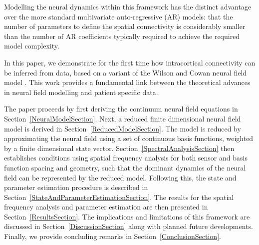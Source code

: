 \documentclass[twocolumn,11pt,a4paper]{article}		%
\begin{document}
Modelling the neural dynamics within this framework has the distinct advantage over the more standard multivariate auto-regressive (AR) models: that the number of parameters to define the spatial connectivity is considerably smaller than the number of AR coefficients typically required to achieve the required model complexity. 

In this paper, we demonstrate for the first time how intracortical connectivity can be inferred from data, based on a variant of the Wilson and Cowan neural field model \cite{Wilson1973}. This work provides a fundamental link between the theoretical advances in neural field modelling and patient specific data.

The paper proceeds by first deriving the continuum neural field equations in Section~\ref{NeuralModelSection}. Next, a reduced finite dimensional neural field model is derived in Section~\ref{ReducedModelSection}. The model is reduced by approximating the neural field using a set of continuous basis functions, weighted by a finite dimensional state vector. Section~\ref{SpectralAnalysisSection} then establishes conditions using spatial frequency analysis for both sensor and basis function spacing and geometry, such that the dominant dynamics of the neural field can be represented by the reduced model. Following this, the state and parameter estimation procedure is described in Section~\ref{StateAndParameterEstimationSection}. The results for the spatial frequency analysis and parameter estimation are then presented in Section~\ref{ResultsSection}. The implications and limitations of this framework are discussed in Section~\ref{DiscussionSection} along with planned future developments. Finally, we provide concluding remarks in Section~\ref{ConclusionSection}.
\end{document}
